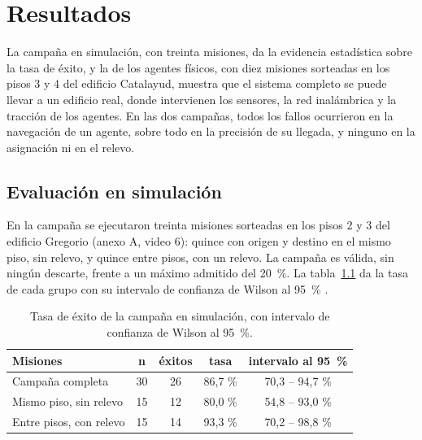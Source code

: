 \chapter{Resultados}
\label{cap:resultados}

La campaña en simulación, con treinta misiones, da la evidencia estadística sobre la tasa de éxito, y la de los agentes físicos, con diez misiones sorteadas en los pisos 3 y 4 del edificio Catalayud, muestra que el sistema completo se puede llevar a un edificio real, donde intervienen los sensores, la red inalámbrica y la tracción de los agentes. En las dos campañas, todos los fallos ocurrieron en la navegación de un agente, sobre todo en la precisión de su llegada, y ninguno en la asignación ni en el relevo.

\section{Evaluación en simulación}
\label{sec:res-sim}

En la campaña se ejecutaron treinta misiones sorteadas en los pisos 2 y 3 del edificio Gregorio (anexo A, video 6): quince con origen y destino en el mismo piso, sin relevo, y quince entre pisos, con un relevo. La campaña es válida, sin ningún descarte, frente a un máximo admitido del 20~\%. La tabla~\ref{tab:exito} da la tasa de cada grupo con su intervalo de confianza de Wilson al 95~\% \autocite{wilson1927probable}.

\begin{table}[H]
  \centering\footnotesize{}
  \caption{Tasa de éxito de la campaña en simulación, con intervalo de confianza
    de Wilson al 95~\%.}
  \label{tab:exito}
  \begin{tabular}{@{}lcccc@{}}
    \toprule
    \textbf{Misiones} & \textbf{n} & \textbf{éxitos} & \textbf{tasa} & \textbf{intervalo al 95~\%} \\ \midrule
    Campaña completa & 30 & 26 & 86,7 \% & 70,3 -- 94,7 \% \\
    Mismo piso, sin relevo & 15 & 12 & 80,0 \% & 54,8 -- 93,0 \% \\
    Entre pisos, con relevo & 15 & 14 & 93,3 \% & 70,2 -- 98,8 \% \\ \bottomrule
  \end{tabular}
\end{table}

